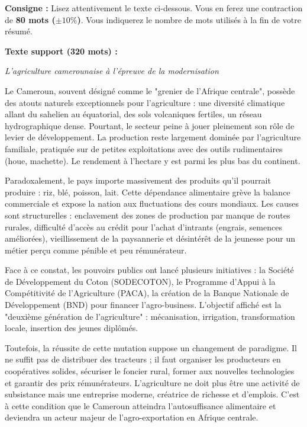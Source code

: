 \documentclass[11pt]{article}
\newcommand{\cle}[1]{{\popxbold\color{popdark}#1}}
\begin{document}
\begin{exercice}
\textbf{Consigne :} Lisez attentivement le texte ci-dessous. Vous en ferez une \cle{contraction} de \textbf{80 mots ($\pm 10\%$)}. Vous indiquerez le nombre de mots utilisés à la fin de votre résumé.

\textbf{Texte support (320 mots) :}

\textit{L'agriculture camerounaise à l'épreuve de la modernisation}

Le Cameroun, souvent désigné comme le "grenier de l'Afrique centrale", possède des atouts naturels exceptionnels pour l'agriculture : une diversité climatique allant du sahelien au équatorial, des sols volcaniques fertiles, un réseau hydrographique dense. Pourtant, le secteur peine à jouer pleinement son rôle de levier de développement. La production reste largement dominée par l'agriculture familiale, pratiquée sur de petites exploitations avec des outils rudimentaires (houe, machette). Le rendement à l'hectare y est parmi les plus bas du continent.

Paradoxalement, le pays importe massivement des produits qu'il pourrait produire : riz, blé, poisson, lait. Cette dépendance alimentaire grève la balance commerciale et expose la nation aux fluctuations des cours mondiaux. Les causes sont structurelles : enclavement des zones de production par manque de routes rurales, difficulté d'accès au crédit pour l'achat d'intrants (engrais, semences améliorées), vieillissement de la paysannerie et désintérêt de la jeunesse pour un métier perçu comme pénible et peu rémunérateur.

Face à ce constat, les pouvoirs publics ont lancé plusieurs initiatives : la Société de Développement du Coton (SODECOTON), le Programme d'Appui à la Compétitivité de l'Agriculture (PACA), la création de la Banque Nationale de Développement (BND) pour financer l'agro-business. L'objectif affiché est la "deuxième génération de l'agriculture" : mécanisation, irrigation, transformation locale, insertion des jeunes diplômés.

Toutefois, la réussite de cette mutation suppose un changement de paradigme. Il ne suffit pas de distribuer des tracteurs ; il faut organiser les producteurs en coopératives solides, sécuriser le foncier rural, former aux nouvelles technologies et garantir des prix rémunérateurs. L'agriculture ne doit plus être une activité de subsistance mais une entreprise moderne, créatrice de richesse et d'emplois. C'est à cette condition que le Cameroun atteindra l'autosuffisance alimentaire et deviendra un acteur majeur de l'agro-exportation en Afrique centrale.


\end{exercice}
\end{document}
